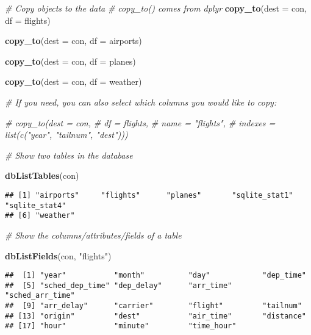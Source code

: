 \documentclass[
]{book}
\newenvironment{Shaded}{\begin{snugshade}}{\end{snugshade}}
\newcommand{\CommentTok}[1]{\textcolor[rgb]{0.56,0.35,0.01}{\textit{#1}}}
\newcommand{\DataTypeTok}[1]{\textcolor[rgb]{0.13,0.29,0.53}{#1}}
\newcommand{\KeywordTok}[1]{\textcolor[rgb]{0.13,0.29,0.53}{\textbf{#1}}}
\newcommand{\NormalTok}[1]{#1}
\newcommand{\StringTok}[1]{\textcolor[rgb]{0.31,0.60,0.02}{#1}}
\begin{document}
\begin{Shaded}
\begin{Highlighting}[]
\CommentTok{\# Copy objects to the data }
\CommentTok{\# copy\_to() comes from dplyr}
\KeywordTok{copy\_to}\NormalTok{(}\DataTypeTok{dest =}\NormalTok{ con, }
        \DataTypeTok{df =}\NormalTok{ flights)}

\KeywordTok{copy\_to}\NormalTok{(}\DataTypeTok{dest =}\NormalTok{ con, }
        \DataTypeTok{df =}\NormalTok{ airports)}

\KeywordTok{copy\_to}\NormalTok{(}\DataTypeTok{dest =}\NormalTok{ con,}
        \DataTypeTok{df =}\NormalTok{ planes)}

\KeywordTok{copy\_to}\NormalTok{(}\DataTypeTok{dest =}\NormalTok{ con, }
        \DataTypeTok{df =}\NormalTok{ weather)}

\CommentTok{\# If you need, you can also select which columns you would like to copy:}

\CommentTok{\# copy\_to(dest = con, }
\CommentTok{\#          df = flights, }
\CommentTok{\#          name = "flights",}
\CommentTok{\#          indexes = list(c("year", "tailnum", "dest")))}
\end{Highlighting}
\end{Shaded}

\begin{Shaded}
\begin{Highlighting}[]
\CommentTok{\# Show two tables in the database }

\KeywordTok{dbListTables}\NormalTok{(con)}
\end{Highlighting}
\end{Shaded}

\begin{verbatim}
## [1] "airports"     "flights"      "planes"       "sqlite_stat1" "sqlite_stat4"
## [6] "weather"
\end{verbatim}

\begin{Shaded}
\begin{Highlighting}[]
\CommentTok{\# Show the columns/attributes/fields of a table }

\KeywordTok{dbListFields}\NormalTok{(con, }\StringTok{"flights"}\NormalTok{)}
\end{Highlighting}
\end{Shaded}

\begin{verbatim}
##  [1] "year"           "month"          "day"            "dep_time"      
##  [5] "sched_dep_time" "dep_delay"      "arr_time"       "sched_arr_time"
##  [9] "arr_delay"      "carrier"        "flight"         "tailnum"       
## [13] "origin"         "dest"           "air_time"       "distance"      
## [17] "hour"           "minute"         "time_hour"
\end{verbatim}
\end{document}
